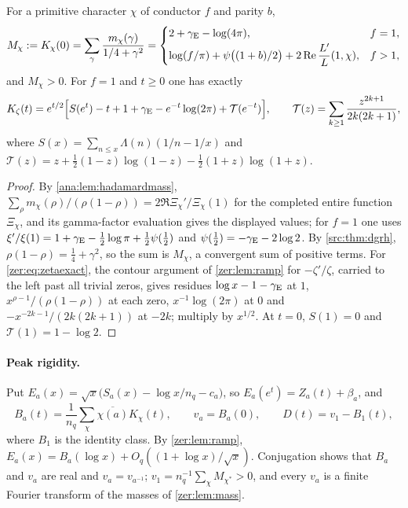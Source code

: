 \begin{lemma}\label{zer:lem:mass}
For a primitive character $\chi$ of conductor $f$ and parity $b$,
\[
 M_\chi:=K_\chi(0)=\sum_\gamma\frac{m_\chi(\gamma)}{1/4+\gamma^2}=
 \begin{cases}2+\gamma_{\mathrm{E}}-\log(4\pi),&f=1,\\[2pt]
 \log(f/\pi)+\psi\bigl((1+b)/2\bigr)+2\operatorname{Re}\dfrac{L'}{L}(1,\chi),&f>1,\end{cases}
\]
and $M_\chi>0$. For $f=1$ and $t\ge0$ one has exactly
\begin{equation}\label{zer:eq:zetaexact}
 K_\zeta(t)=e^{t/2}\Bigl[S(e^t)-t+1+\gamma_{\mathrm{E}}-e^{-t}\log(2\pi)+\mathcal T(e^{-t})\Bigr],\qquad
 \mathcal T(z)=\sum_{k\ge1}\frac{z^{2k+1}}{2k(2k+1)},
\end{equation}
where $S(x)=\sum_{n\le x}\Lambda(n)(1/n-1/x)$ and
$\mathcal T(z)=z+\tfrac12(1-z)\log(1-z)-\tfrac12(1+z)\log(1+z)$.
\end{lemma}
\begin{proof}
By \cref{ana:lem:hadamardmass}, $\sum_\rho m_\chi(\rho)/(\rho(1-\rho))=2\Re\Xi_\chi'/\Xi_\chi(1)$ for the
completed entire function $\Xi_\chi$, and its gamma-factor evaluation gives the displayed values;
for $f=1$ one uses $\xi'/\xi(1)=1+\gamma_{\mathrm{E}}-\tfrac12\log\pi+\tfrac12\psi(\tfrac12)$ and
$\psi(\tfrac12)=-\gamma_{\mathrm{E}}-2\log2$. By \cref{src:thm:dgrh}, $\rho(1-\rho)=\tfrac14+\gamma^2$, so the sum is
$M_\chi$, a convergent sum of positive terms. For
\eqref{zer:eq:zetaexact}, the contour argument of \cref{zer:lem:ramp} for $-\zeta'/\zeta$, carried to
the left past all trivial zeros, gives residues $\log x-1-\gamma_{\mathrm{E}}$ at $1$,
$x^{\rho-1}/(\rho(1-\rho))$ at each zero, $x^{-1}\log(2\pi)$ at $0$ and $-x^{-2k-1}/(2k(2k+1))$ at $-2k$;
multiply by $x^{1/2}$. At $t=0$, $S(1)=0$ and $\mathcal T(1)=1-\log2$.
\end{proof}

\paragraph{Peak rigidity.}
Put $E_a(x)=\sqrt x\bigl(S_a(x)-\log x/n_q-c_a\bigr)$, so $E_a(e^t)=Z_a(t)+\beta_a$, and
\[
 B_a(t)=\frac1{n_q}\sum_\chi\overline{\chi(a)}K_\chi(t),\qquad v_a=B_a(0),\qquad D(t)=v_1-B_1(t),
\]
where $B_1$ is the identity class. By \cref{zer:lem:ramp},
$E_a(x)=B_a(\log x)+O_q((1+\log x)/\sqrt x)$. Conjugation shows that $B_a$ and $v_a$ are real and
$v_a=v_{a^{-1}}$; $v_1=n_q^{-1}\sum_\chi M_{\chi^*}>0$, and every $v_a$ is a finite Fourier transform
of the masses of \cref{zer:lem:mass}.

